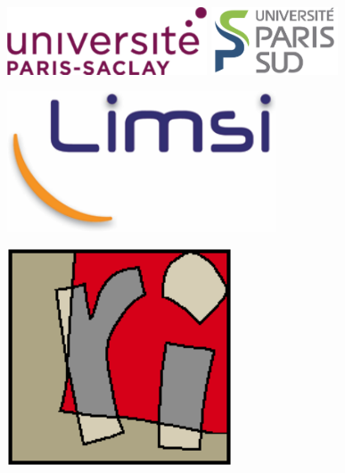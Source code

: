 \documentclass[oneside]{memoir}
\begin{document}
\begin{titlingpage}
 
\begin{center}
 
% 
\includegraphics[height=2cm]{logos/upsay.pdf} \hfill %
\includegraphics[height=2cm]{logos/ups.png} %
\\[1.5cm]


\begin{minipage}{0.2\textwidth}
  \begin{flushright}
    \includegraphics[width=0.6\textwidth]{logos/limsi.png}
  \end{flushright}
\end{minipage}
\begin{minipage}{0.2\textwidth}
  \begin{flushright}
    \includegraphics[width=0.5\textwidth]{logos/lri.png}
  \end{flushright}
\end{minipage}



\end{center}
\end{titlingpage}
\end{document}
